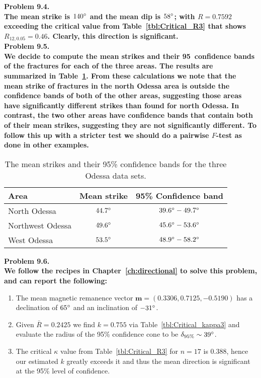 \noindent
\bf{Problem 9.4.} \\

The mean strike is $140^{\circ}$ and the mean dip is $58^{\circ}$; with $R = 0.7592$ exceeding the
critical value from Table~\ref{tbl:Critical_R3} that shows $R_{12,0.05} = 0.46$.
Clearly, this direction is significant.
\\

\noindent
\bf{Problem 9.5.} \\
We decide to compute the mean strikes and their 95\ confidence bands of the fractures for each of the three areas.
The results are summarized in Table~\ref{tbl:odessa}. From these calculations we note that the mean strike
of fractures in the north Odessa area is outside the confidence bands of both of the other areas, suggesting
those areas have significantly different strikes than found for north Odessa.  In contrast, the two other areas
have confidence bands that contain both of their mean strikes, suggesting they are not significantly different.
To follow this up with a stricter test we should do a pairwise $F$-test as done in other examples.

\begin{table}[h]
\centering
\begin{tabular}{|l||c|c|} \hline
\bf{Area}		 & \bf{Mean strike}  & \bf{95\% Confidence band} \\ \hline
North Odessa	 & $44.7^{\circ}$         & $39.6^{\circ}-49.7^{\circ}$ \\ \hline
Northwest Odessa & $49.6^{\circ}$         & $45.6^{\circ}-53.6^{\circ}$ \\ \hline
West Odessa		 & $53.5^{\circ}$         & $48.9^{\circ}-58.2^{\circ}$ \\ \hline
\end{tabular}
\caption{The mean strikes and their 95\% confidence bands for the three Odessa data sets.}
\label{tbl:odessa}
\end{table}


\noindent
\bf{Problem 9.6.} \\

We follow the recipes in Chapter~\ref{ch:directional} to solve this problem, and can report the following:
\begin{enumerate}[label=\alph*)]
\item The mean magnetic remanence vector $\mathbf{m} = (0.3306, 0.7125, -0.5190)$ has a declination of $65^{\circ}$ and an inclination of $-31^{\circ}$.
\item Given $\bar{R} = 0.2425$ we find $k = 0.755$ via Table~\ref{tbl:Critical_kappa3} and evaluate
the radius of the 95\% confidence cone to be $\delta_{95\%} \sim39^{\circ}$.
\item The critical $\kappa$ value from Table~\ref{tbl:Critical_R3} for $n = 17$ is 0.388, hence our estimated $k$
greatly exceeds it and thus the mean direction is significant at the 95\% level of confidence.
\end{enumerate}

